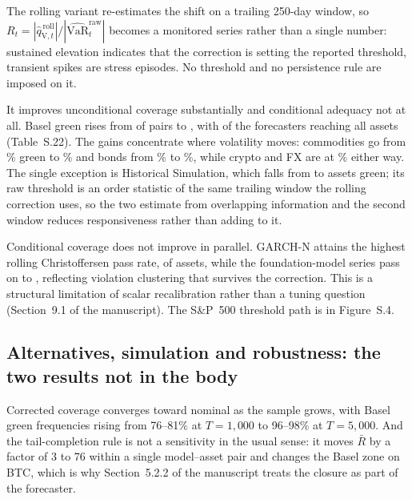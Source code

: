 \documentclass[preprint,11pt,authoryear]{elsarticle}
\newcommand{\VaR}{\mathrm{VaR}}
\newcommand{\1}{\boldsymbol{1}}
\newcommand{\qVroll}{\hat{q}_{{\scriptscriptstyle\mathrm{V}},t}^{\,\mathrm{roll}}}
\begin{document}
The rolling variant re-estimates the shift on a trailing 250-day window, so
$R_t = |\qVroll|/|\widehat{\VaR}^{\mathrm{raw}}_t|$ becomes a monitored series
rather than a single number: sustained elevation indicates that the correction is
setting the reported threshold, transient spikes are stress episodes. No
threshold and no persistence rule are imposed on it.

It improves unconditional coverage substantially and conditional adequacy not at
all. Basel green rises from \nSupGreenStatic{} of \nSeqPairs{} pairs to
\nSupGreenRoll, with \nSeqRollAllAssets{} of the \nSeqForecasters{} forecasters reaching all
\nMainAssets{} assets (Table~S.22). The gains concentrate where volatility
moves: commodities go from \nSupGreenStaticPctComm\% green to
\nSupGreenRollPctComm\% and bonds from \nSupGreenStaticPctBond\% to
\nSupGreenRollPctBond\%, while crypto and FX are at
\nSupGreenRollPctComm\% either way. The single exception is Historical Simulation, which falls from
\nSupHistSimGreenStatic{} to \nSupHistSimGreenRoll{} assets green; its raw threshold is an order statistic of the same
trailing window the rolling correction uses, so the two estimate from overlapping
information and the second window reduces responsiveness rather than adding to it.

Conditional coverage does not improve in parallel. GARCH-N attains the highest
rolling Christoffersen pass rate, \nSupRollCCBest{} of \nMainAssets{} assets,
while the \nSupRollCCTsfmN{} foundation-model series pass on
\nSupRollCCTsfmLo{} to \nSupRollCCTsfmHi, reflecting violation clustering that
survives the correction. This is a structural limitation of
scalar recalibration rather than a tuning question
(Section~9.1 of the manuscript). The S\&P~500 threshold path is in Figure~S.4.


\subsection{Alternatives, simulation and robustness: the two results not in the body}
\label{app:alt_detail}

Corrected coverage converges toward nominal as the sample grows, with Basel green
frequencies rising from 76--81\% at $T = 1{,}000$ to 96--98\% at $T = 5{,}000$.
And the tail-completion rule is not a sensitivity in the usual sense: it moves
$\bar R$ by a factor of 3 to 76 within a single model--asset pair and changes the
Basel zone on BTC, which is why Section~5.2.2 of the manuscript treats the
closure as part of the forecaster.
\end{document}
